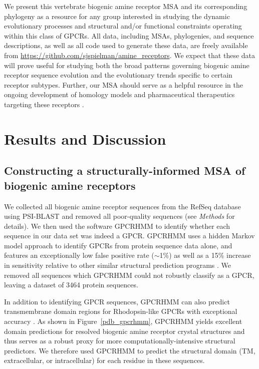 \documentclass[fleqn,10pt]{wlpeerj}
\begin{document}
We present this vertebrate biogenic amine receptor MSA and its corresponding phylogeny as a resource for any group interested in studying the dynamic evolutionary processes and structural and/or functional constraints operating within this class of GPCRs. All data, including MSAs, phylogenies, and sequence descriptions, as well as all code used to generate these data, are freely available from \url{https://github.com/sjspielman/amine\_receptors}. We expect that these data will prove useful for studying both the broad patterns governing biogenic amine receptor sequence evolution and the evolutionary trends specific to certain receptor subtypes. Further, our MSA should serve as a helpful resource in the ongoing development of homology models and pharmaceutical therapeutics targeting these receptors \citep{Kristiansen2004,Ishiguro2004,Eversetal2005,Masonetal2012}.




\section*{Results and Discussion}

\subsection*{Constructing a structurally-informed MSA of biogenic amine receptors}

We collected all biogenic amine receptor sequences from the RefSeq database \citep{refseq} using PSI-BLAST and removed all poor-quality sequences (see \emph{Methods} for details). We then used the software GPCRHMM \citep{Wistrand2006} to identify whether each sequence in our data set was indeed a GPCR. GPCRHMM uses a hidden Markov model approach to identify GPCRs from protein sequence data alone, and features an exceptionally low false positive rate ($\sim$1\%) as well as a 15\% increase in sensitivity relative to other similar structural prediction programs \citep{Wistrand2006}. We removed all sequences which GPCRHMM could not robustly classify as a GPCR, leaving a dataset of 3464 protein sequences. 

In addition to identifying GPCR sequences, GPCRHMM can also predict transmembrane domain regions for Rhodopsin-like GPCRs with exceptional accuracy \citep{SpielmanWilke2013}. As shown in Figure~\ref{pdb_gpcrhmm}, GPCRHMM yields excellent domain predictions for resolved biogenic amine receptor crystal structures and thus serves as a robust proxy for more computationally-intensive structural predictors. We therefore used GPCRHMM to predict the structural domain (TM, extracellular, or intracellular) for each residue in these sequences.
\end{document}
